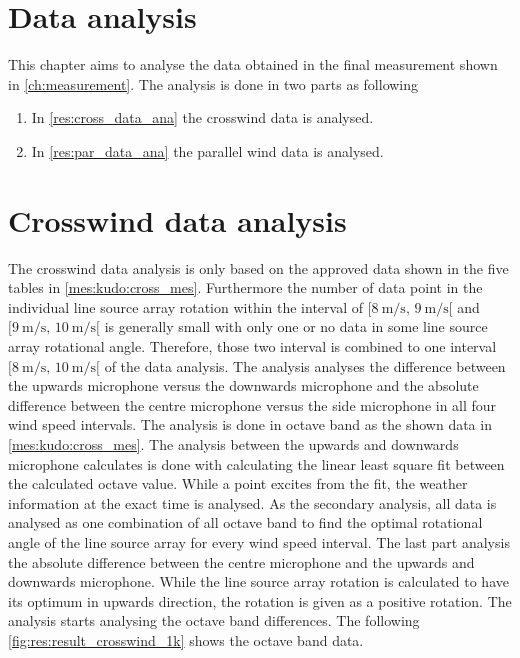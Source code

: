 \section{Data analysis}
This chapter aims to analyse the data obtained in the final measurement shown in \autoref{ch:measurement}. The analysis is done in two parts as following 

\begin{enumerate}
\item In \autoref{res:cross_data_ana} the crosswind data is analysed.
\item In \autoref{res:par_data_ana} the parallel wind data is analysed.
\end{enumerate}





\section{Crosswind data analysis}\label{res:cross_data_ana}
The crosswind data analysis is only based on the approved data shown in the five tables in \autoref{mes:kudo:cross_mes}. Furthermore the number of data point in the individual line source array rotation within the interval of $[\SI{8}{\meter\per\second},\, \SI{9}{\meter\per\second}[ $ and $[\SI{9}{\meter\per\second},\, \SI{10}{\meter\per\second}[ $ is generally small with only one or no data in some line source array rotational angle. Therefore, those two interval is combined to one interval $[\SI{8}{\meter\per\second},\, \SI{10}{\meter\per\second}[ $ of the data analysis. The analysis analyses the difference between the upwards microphone versus the downwards microphone and the absolute difference between the centre microphone versus the side microphone in all four wind speed intervals. The analysis is done in octave band as the shown data in \autoref{mes:kudo:cross_mes}. The analysis between the upwards and downwards microphone calculates is done with calculating the linear least square fit between the calculated octave value. While a point excites  from the fit, the weather information at the exact time is analysed. As the secondary analysis, all data is analysed as one combination of all octave band to find the optimal rotational angle of the line source array for every wind speed interval. The last part analysis the absolute difference between the centre microphone and the upwards and downwards microphone. While the line source array rotation is calculated to have its optimum in upwards direction, the rotation is given as a positive rotation. The analysis starts analysing the octave band differences. The following \autoref{fig:res:result_crosswind_1k}  shows the  octave band data.  


